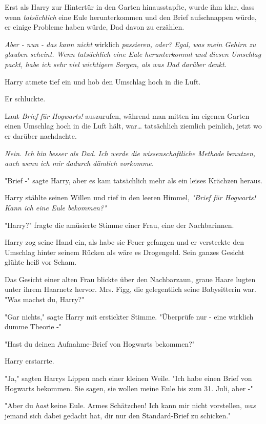 {Erst als Harry zur Hintertür in den Garten hinausstapfte, wurde ihm klar, dass wenn \emph{tatsächlich} eine Eule herunterkommen und den Brief aufschnappen würde, er einige Probleme haben würde, Dad davon zu erzählen.

\emph{Aber - nun - das kann nicht} wirklich \emph{passieren, oder? Egal, was mein Gehirn zu glauben scheint. Wenn tatsächlich eine Eule herunterkommt und diesen Umschlag packt, habe ich sehr viel wichtigere Sorgen, als was Dad darüber denkt.}

Harry atmete tief ein und hob den Umschlag hoch in die Luft.

Er schluckte.

Laut \emph{Brief für Hogwarts!} auszurufen, während man mitten im eigenen Garten einen Umschlag hoch in die Luft hält, war… tatsächlich ziemlich peinlich, jetzt wo er darüber nachdachte.

\emph{Nein. Ich bin besser als Dad. Ich werde die wissenschaftliche Methode benutzen, auch wenn ich mir dadurch dämlich vorkomme.}

"Brief -" sagte Harry, aber es kam tatsächlich mehr als ein leises Krächzen heraus.

Harry stählte seinen Willen und rief in den leeren Himmel, \emph{"Brief für Hogwarts! Kann ich eine Eule bekommen?"}

"Harry?" fragte die amüsierte Stimme einer Frau, eine der Nachbarinnen.

Harry zog seine Hand ein, als habe sie Feuer gefangen und er versteckte den Umschlag hinter seinem Rücken als wäre es Drogengeld. Sein ganzes Gesicht glühte heiß vor Scham.

Das Gesicht einer alten Frau blickte über den Nachbarzaun, graue Haare lugten unter ihrem Haarnetz hervor. Mrs. Figg, die gelegentlich seine Babysitterin war. "Was machst du, Harry?"

"Gar nichts," sagte Harry mit erstickter Stimme. "Überprüfe nur - eine wirklich dumme Theorie -"

"Hast du deinen Aufnahme-Brief von Hogwarts bekommen?"

Harry erstarrte.

"Ja," sagten Harrys Lippen nach einer kleinen Weile. "Ich habe einen Brief von Hogwarts bekommen. Sie sagen, sie wollen meine Eule bis zum 31. Juli, aber -"

"Aber du \emph{hast} keine Eule. Armes Schätzchen! Ich kann mir nicht vorstellen, \emph{was} jemand sich dabei gedacht hat, dir nur den Standard-Brief zu schicken."

}
